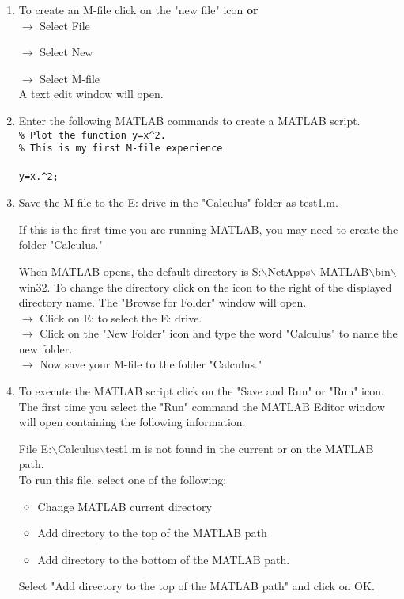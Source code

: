 \begin{enumerate}
  \item To create an M-file click on the "new file" icon \textbf{or}\\
  $\rightarrow$ Select File
  
  \hspace{.2in}$\rightarrow$  Select New 
  
  \hspace{.4in}$\rightarrow$  Select M-file\\
  A text edit window will open.
  
  \item Enter the following MATLAB commands to create a MATLAB script.\\
  \verb!% Plot the function y=x^2.!\\
  \verb!% This is my first M-file experience!\\
  \\
  \verb!y=x.^2;!\\
  
  \item Save the M-file to the E: drive in the "Calculus" folder as test1.m.
  
  If this is the first time you are running MATLAB, you may need to create the
  folder "Calculus."
  
  When MATLAB opens, the default directory is S:$\backslash$NetApps$\backslash$ 
  MATLAB$\backslash$bin$\backslash$win32.  To change the directory click on the
  icon to the right of the displayed directory name.  The "Browse for Folder"
  window will open.\\
  $\rightarrow$ Click on E: to select the E: drive.\\
  $\rightarrow$ Click on the "New Folder" icon and type the word "Calculus" to
  name the new folder.\\
  $\rightarrow$ Now save your M-file to the folder "Calculus."
  
  \item To execute the MATLAB script click on the "Save and Run" or "Run" icon. 
  The first time you select the "Run" command the MATLAB Editor window will open
  containing the following information:
  
  File E:$\backslash$Calculus$\backslash$test1.m is not found in the current
  or on the MATLAB path.\\ 
  To run this file, select one of the following:
  \begin{itemize}
    \item Change MATLAB current directory
    \item Add directory to the top of the MATLAB path
    \item Add directory to the bottom of the MATLAB path.
  \end{itemize}
  Select "Add directory to the top of the MATLAB path" and click on OK.
  

\end{enumerate}
